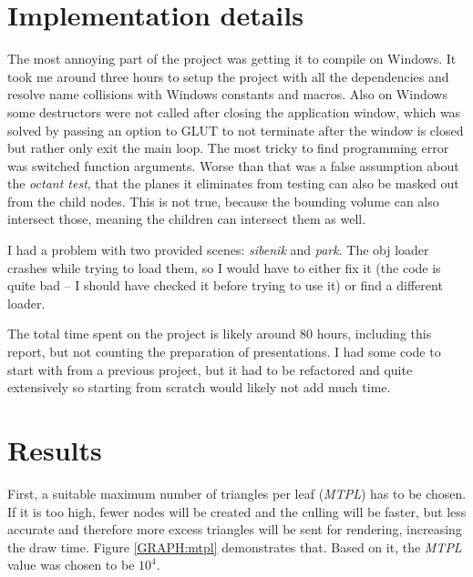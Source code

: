 \documentclass[report,11pt]{elsarticle}
\begin{document}
\section{\label{SEC:Pitfalls}Implementation details}
The most annoying part of the project was getting it to compile on Windows. It took me around three hours to setup the project with all the dependencies and resolve name collisions with Windows constants and macros. Also on Windows some destructors were not called after closing the application window, which was solved by passing an option to GLUT to not terminate after the window is closed but rather only exit the main loop. The most tricky to find programming error was switched function arguments. Worse than that was a false assumption about the \emph{octant test}, that the planes it eliminates from testing can also be masked out from the child nodes. This is not true, because the bounding volume can also intersect those, meaning the children can intersect them as well.

I had a problem with two provided scenes: \emph{sibenik} and \emph{park}. The obj loader crashes while trying to load them, so I would have to either fix it (the code is quite bad -- I should have checked it before trying to use it) or find a different loader.

The total time spent on the project is likely around 80 hours, including this report, but not counting the preparation of presentations. I had some code to start with from a previous project, but it had to be refactored and quite extensively so starting from scratch would likely not add much time.

\section{\label{SEC:Results}Results}
First, a suitable maximum number of triangles per leaf (\emph{MTPL}) has to be chosen. If it is too high, fewer nodes will be created and the culling will be faster, but less accurate and therefore more excess triangles will be sent for rendering, increasing the draw time. Figure \ref{GRAPH:mtpl} demonstrates that. Based on it, the \emph{MTPL} value was chosen to be $10^{4}$.
\end{document}
